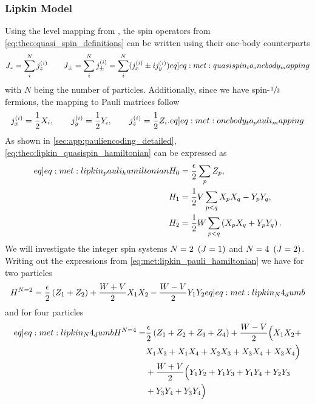 \subsubsection{Lipkin Model}
Using the level mapping from \citep{hlatshwayoSimulatingExcitedStates2022}, the spin operators from \cref{eq:theo:quasi_spin_definitions} can be written using their one-body counterparts 
\begin{align}
    J_z = \sum_{i}^{N} \spinsmall{z}{i} \hspace{20px} J_\pm = \sum_i^N \spinsmall{\pm}{i} = \sum_i^N (\spinsmall{x}{i}\pm i\spinsmall{y}{i}) \label[eq]{eq:met:quasispin_to_onebody_mapping}
\end{align}
with $N$ being the number of particles. Additionally, since we have spin-$\sfrac{1}{2}$ fermions, the mapping to Pauli matrices follow
\begin{align}
    \spinsmall{x}{i} = \frac{1}{2}X_i,\hspace{20px}\spinsmall{y}{i} = \frac{1}{2}Y_i,\hspace{20px}\spinsmall{z}{i} = \frac{1}{2}Z_i. \label[eq]{eq:met:onebody_to_pauli_mapping}
\end{align}
As shown in \cref{sec:app:pauliencoding_detailed}, \cref{eq:theo:lipkin_quasispin_hamiltonian} can be expressed as
\begin{align}
    \begin{split}\label[eq]{eq:met:lipkin_pauli_hamiltonian} 
        H_0 &= \frac{\epsilon}{2}\sum_{p}Z_p,  \\
        H_1 &= \frac{1}{2}V \sum_{p < q} X_p X_q - Y_p Y_q, \\
        H_2 &= \frac{1}{2}W \sum_{p < q} \pclosed{ X_p X_q + Y_p Y_q }. 
    \end{split}
\end{align}
We will investigate the integer spin systems $N=2\hspace{5px}(J=1)$ and $N=4\hspace{5px}(J=2)$. Writing out the expressions from \cref{eq:met:lipkin_pauli_hamiltonian} we have for two particles
\begin{align}
    H^{N=2} = \frac{\epsilon}{2}\pclosed{Z_1 + Z_2} + \frac{W+V}{2} X_1 X_2 - \frac{W-V}{2} Y_1 Y_2 \label[eq]{eq:met:lipkin_N4_dumb}
\end{align}
and for four particles
\begin{align}
    \begin{split} \label[eq]{eq:met:lipkin_N4_dumb}
        H^{N=4} =& \frac{\epsilon}{2}\pclosed{Z_1 + Z_2 + Z_3 + Z_4} + \frac{W-V}{2}\Big( X_1 X_2 +\\ 
        & X_1 X_3 + X_1 X_4 + X_2 X_3 + X_3 X_4 + X_3 X_4
        \Big) \\
        &+ \frac{W+V}{2}\Big( Y_1 Y_2 + Y_1 Y_3 + Y_1 Y_4 + Y_2 Y_3 \\
        & + Y_3 Y_4 + Y_3 Y_4\Big)
    \end{split}
\end{align}
